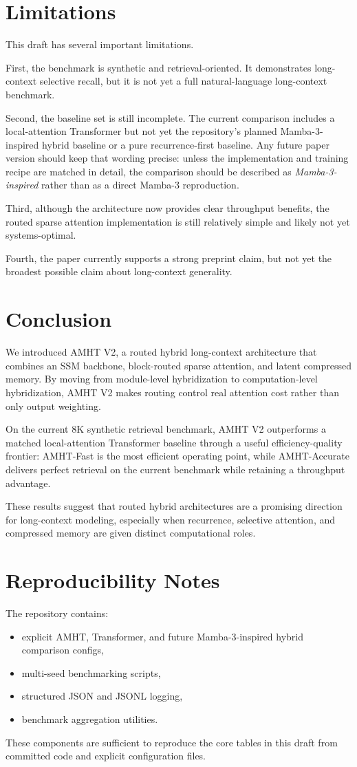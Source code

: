 \documentclass[11pt]{article}
\begin{document}
\section{Limitations}
This draft has several important limitations.

First, the benchmark is synthetic and retrieval-oriented. It demonstrates long-context selective recall, but it is not yet a full natural-language long-context benchmark.

Second, the baseline set is still incomplete. The current comparison includes a local-attention Transformer but not yet the repository's planned Mamba-3-inspired hybrid baseline or a pure recurrence-first baseline. Any future paper version should keep that wording precise: unless the implementation and training recipe are matched in detail, the comparison should be described as \emph{Mamba-3-inspired} rather than as a direct Mamba-3 reproduction.

Third, although the architecture now provides clear throughput benefits, the routed sparse attention implementation is still relatively simple and likely not yet systems-optimal.

Fourth, the paper currently supports a strong preprint claim, but not yet the broadest possible claim about long-context generality.

\section{Conclusion}
We introduced AMHT V2, a routed hybrid long-context architecture that combines an SSM backbone, block-routed sparse attention, and latent compressed memory. By moving from module-level hybridization to computation-level hybridization, AMHT V2 makes routing control real attention cost rather than only output weighting.

On the current 8K synthetic retrieval benchmark, AMHT V2 outperforms a matched local-attention Transformer baseline through a useful efficiency-quality frontier: AMHT-Fast is the most efficient operating point, while AMHT-Accurate delivers perfect retrieval on the current benchmark while retaining a throughput advantage.

These results suggest that routed hybrid architectures are a promising direction for long-context modeling, especially when recurrence, selective attention, and compressed memory are given distinct computational roles.

\section{Reproducibility Notes}
The repository contains:
\begin{itemize}
  \item explicit AMHT, Transformer, and future Mamba-3-inspired hybrid comparison configs,
  \item multi-seed benchmarking scripts,
  \item structured JSON and JSONL logging,
  \item benchmark aggregation utilities.
\end{itemize}

These components are sufficient to reproduce the core tables in this draft from committed code and explicit configuration files.



\end{document}

